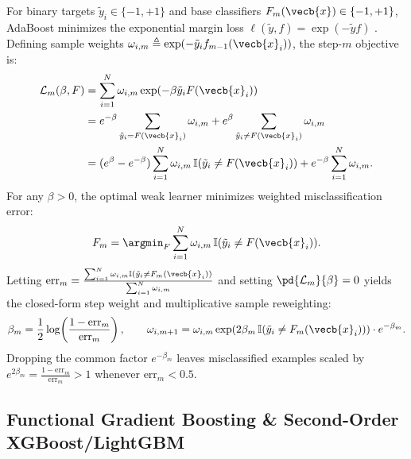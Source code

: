 \documentclass[../../../../master.tex]{subfiles}
\begin{document}
\begin{coremath}
For binary targets $\tilde{y}_i \in \{-1, +1\}$ and base classifiers $F_m(\vecb{x}) \in \{-1, +1\}$, AdaBoost minimizes the exponential margin loss $\ell(\tilde{y}, f) = \exp(-\tilde{y} f)$ . Defining sample weights $\omega_{i,m} \triangleq \exp(-\tilde{y}_i f_{m-1}(\vecb{x}_i))$, the step-$m$ objective is:
\begin{align}
  \mathcal{L}_m(\beta, F) &= \sum_{i=1}^{N} \omega_{i,m} \exp\!\left(-\beta \tilde{y}_i F(\vecb{x}_i)\right) \nonumber \\
  &= e^{-\beta}\sum_{\tilde{y}_i = F(\vecb{x}_i)} \omega_{i,m} + e^{\beta}\sum_{\tilde{y}_i \neq F(\vecb{x}_i)} \omega_{i,m} \nonumber \\
  &= (e^{\beta} - e^{-\beta}) \sum_{i=1}^{N} \omega_{i,m}\,\mathbb{I}(\tilde{y}_i \neq F(\vecb{x}_i)) + e^{-\beta}\sum_{i=1}^{N}\omega_{i,m}.
  \label{eq:trees:adaboost_obj}
\end{align}
For any $\beta > 0$, the optimal weak learner minimizes weighted misclassification error:
\begin{equation}
  F_m = \argmin_{F} \sum_{i=1}^{N} \omega_{i,m}\,\mathbb{I}(\tilde{y}_i \neq F(\vecb{x}_i)).
\end{equation}
Letting $\mathrm{err}_m = \frac{\sum_{i=1}^{N} \omega_{i,m}\mathbb{I}(\tilde{y}_i \neq F_m(\vecb{x}_i))}{\sum_{i=1}^{N} \omega_{i,m}}$ and setting $\pd{\mathcal{L}_m}{\beta} = 0$ yields the closed-form step weight and multiplicative sample reweighting:
\begin{equation}
  \beta_m = \frac{1}{2}\log\!\left(\frac{1 - \mathrm{err}_m}{\mathrm{err}_m}\right), \qquad
  \omega_{i,m+1} = \omega_{i,m}\exp\!\left(2\beta_m\,\mathbb{I}(\tilde{y}_i \neq F_m(\vecb{x}_i))\right) \cdot e^{-\beta_m}.
  \label{eq:trees:adaboost_update}
\end{equation}
Dropping the common factor $e^{-\beta_m}$ leaves misclassified examples scaled by $e^{2\beta_m} = \frac{1-\mathrm{err}_m}{\mathrm{err}_m} > 1$ whenever $\mathrm{err}_m < 0.5$.
\end{coremath}

\subsection{Functional Gradient Boosting \& Second-Order XGBoost/LightGBM}
\end{document}
